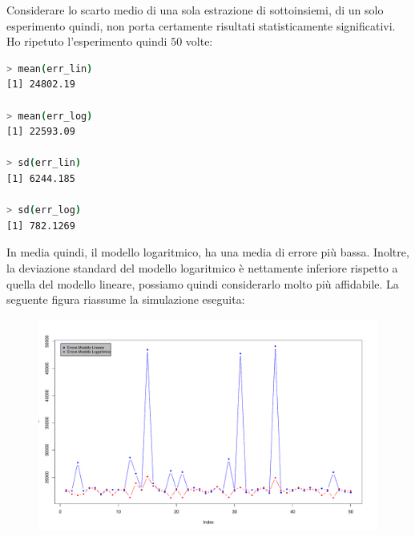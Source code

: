 \documentclass[11pt,a4paper]{article}
\begin{document}
Considerare lo scarto medio di una sola estrazione di sottoinsiemi, di un solo
esperimento quindi, non porta certamente risultati statisticamente
significativi. Ho ripetuto l'esperimento quindi $50$ volte:
\begin{lstlisting}[language=bash,basicstyle=\tiny,tabsize=2,frame = single]
> mean(err_lin)
[1] 24802.19

> mean(err_log)
[1] 22593.09

> sd(err_lin)
[1] 6244.185

> sd(err_log)
[1] 782.1269
\end{lstlisting}
In media quindi, il modello logaritmico, ha una media di errore pi\`u bassa.
Inoltre, la deviazione standard del modello logaritmico \`e nettamente
inferiore rispetto a quella del modello lineare, possiamo quindi considerarlo
molto pi\`u affidabile. La seguente figura riassume la simulazione eseguita:
\begin{figure}[H]
	\begin{center}
		\vspace{-1.5cm}
		\hspace*{-2.7cm}
		\includegraphics[scale=0.65]{imgs/simulation.pdf}
		\vspace{-1cm}
	\end{center}
\end{figure}
\end{document}

